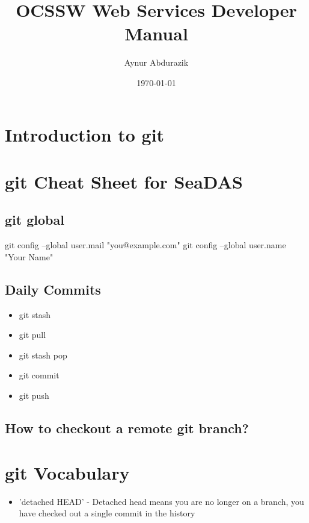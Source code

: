 \documentclass[11pt, oneside]{article}   	%
\title{OCSSW Web Services Developer Manual}
\author{Aynur Abdurazik}
\date{\today}							%
\begin{document}
\maketitle

\section{Introduction to git}


\section{git Cheat Sheet for SeaDAS}

\subsection{git global}
git config --global user.mail "you@example.com"
git config --global user.name "Your Name"

 \subsection{Daily Commits}
 \begin{itemize}
 \item git stash
 \item git pull
 \item git stash pop
 \item git commit
 \item git push
 \end{itemize}

 \subsection{How to checkout a remote git branch?}


\section{git Vocabulary}
\begin{itemize}
\item 'detached HEAD' - Detached head means you are no longer on a branch, you have checked out a single commit in the history
\end{itemize}
\end{document}
